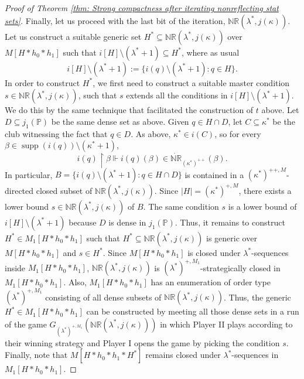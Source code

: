 \documentclass[11pt]{amsart}
\renewcommand{\restriction}{\mathbin\upharpoonright}    %
\theoremstyle{definition}
\newcounter{condition}
\theoremstyle{remark}
\newcommand\<{{<}}
\DeclareMathOperator{\supp}{supp}
\newcommand{\po}{\mathbb{P}}
\begin{document}
\begin{proof}[Proof of Theorem \ref{thm: Strong compactness after iterating nonreflecting stat sets}]
Finally, let us proceed with the last bit of the iteration, $\mathbb{NR}(\lambda^*, j(\kappa))$. Let us construct a suitable generic set $H^*\subseteq \mathbb{NR}(\lambda^*, j(\kappa))$ over $M[H*h_0*h_1]$ such that $i[H]\setminus (\lambda^*+1)\subseteq H^*$, where as usual
$$ i[H]\setminus (\lambda^*+1) := \{i(q)\setminus (\lambda^*+1)\colon q\in H\}.$$
In order to construct $H^*$, we first need to  construct a suitable master condition $s\in \mathbb{NR}(\lambda^*, j(\kappa))$, such that $s$ extends all the conditions in $i[H]\setminus (\lambda^*+1)$. We do this by the same technique that facilitated the construction of $t$ above. Let $D\subseteq j_1(\po)$ be the same dense set as above. Given $q\in H\cap D$, let $C\subseteq \kappa^*$ be the club witnessing the fact that $q\in D$. As above, $\kappa^*\in i(C)$, so for every $\beta\in \supp(i(q))\setminus ( \kappa^*+1 )$, 
$$i(q)\restriction\beta\Vdash i(q)(\beta)\in \dot{\mathbb{NR}}_{(\kappa^*)^{++}}(\beta).$$
In particular, $B = \{ i(q)\setminus (\lambda^*+1) \colon q\in H\cap D \}$ is contained in a $(\kappa^{*})^{++, M}$-directed closed subset of $\mathbb{NR}(\lambda^*, j(\kappa))$. Since $|H| = (\kappa^*)^{+, M}$, there exists a lower bound $s\in \mathbb{NR}(\lambda^*, j(\kappa))$ of $B$. The same condition $s$ is a lower bound of $i[H]\setminus (\lambda^*+1)$ because $D$ is dense in $j_1(\po)$. Thus, it remains to construct $H^*\in M_1[H*h_0*h_1]$ such that $H^*\subseteq \mathbb{NR}(\lambda^*, j(\kappa))$ is generic over $M[H*h_0*h_1]$ and $s\in H^*$. Since $M[H*h_0*h_1]$ is closed under $\lambda^*$-sequences inside $M_1[H*h_0*h_1]$, $\mathbb{NR}(\lambda^*, j(\kappa))$ is $(\lambda^*)^{+, M_1}$-strategically closed in $M_1[H*h_0*h_1]$. Also, $M_1[H*h_0*h_1]$ has an enumeration of order type $(\lambda^*)^{+, M_1}$ consisting of all dense subsets of $\mathbb{NR}(\lambda^*, j(\kappa))$. Thus, the generic $H^*\in M_1[H*h_0*h_1]$ can be constructed by meeting all those dense sets in a run of the game $G_{(\lambda^*)^{+, M_1}}( \mathbb{NR}(\lambda^*, j(\kappa)) )$ in which Player II plays according to their winning strategy and Player I opens the game by picking the condition $s$. Finally, note that $M[H*h_0*h_1*H^*]$ remains closed under $\lambda^*$-sequences in $M_1[H*h_0*h_1]$.


\smallskip


\end{proof}
\end{document}
